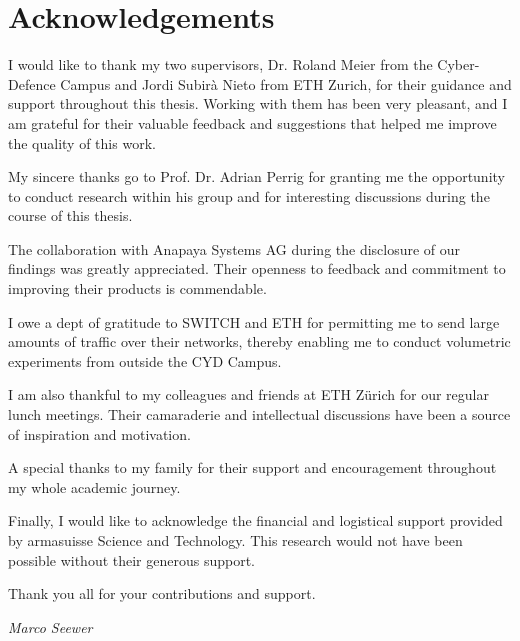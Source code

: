 \chapter*{Acknowledgements}


I would like to thank my two supervisors, Dr. Roland Meier from the Cyber-Defence Campus and Jordi Subirà Nieto from ETH Zurich, for their guidance and support throughout this thesis.
Working with them has been very pleasant, and I am grateful for their valuable feedback and suggestions that helped me improve the quality of this work.

My sincere thanks go to Prof. Dr. Adrian Perrig for granting me the opportunity to conduct research within his group and for interesting discussions during the course of this thesis.

The collaboration with Anapaya Systems AG during the disclosure of our findings was greatly appreciated.
Their openness to feedback and commitment to improving their products is commendable.

I owe a dept of gratitude to SWITCH and ETH for permitting me to send large amounts of traffic over their networks, thereby enabling me to conduct volumetric experiments from outside the CYD Campus.

I am also thankful to my colleagues and friends at ETH Zürich for our regular lunch meetings.
Their camaraderie and intellectual discussions have been a source of inspiration and motivation.

A special thanks to my family for their support and encouragement throughout my whole academic journey.

Finally, I would like to acknowledge the financial and logistical support provided by armasuisse Science and Technology.
This research would not have been possible without their generous support.

Thank you all for your contributions and support.

\begin{flushright}
\textit{Marco Seewer}
\end{flushright}
